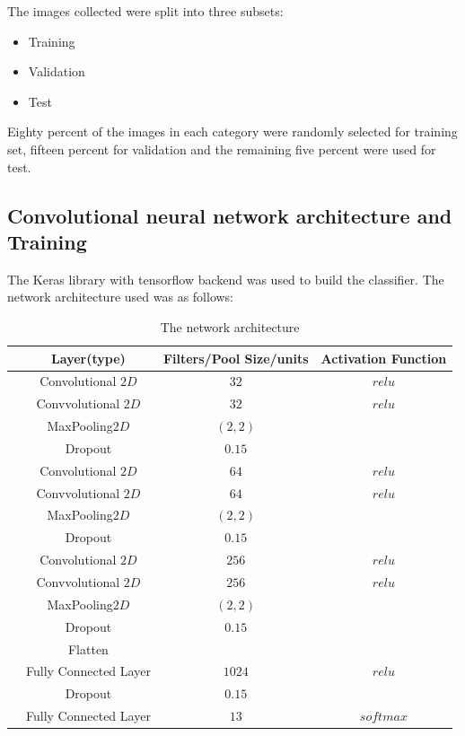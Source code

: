 \documentclass[11pt]{article}
\begin{document}
The images collected were split into three subsets: 
\begin{itemize}
	\item
	Training
	\item 
	Validation
	\item 
	Test
\end{itemize}
Eighty percent of the images in each category were randomly selected for training set, fifteen percent for validation and the remaining five percent were used for test.  
\subsection{Convolutional neural network architecture and Training}

The Keras library with tensorflow backend was used to build the classifier. The network architecture used was as follows:

\begin{center}
\begin{table}[H]
 \begin{tabular}{||c c c c||} 
 \hline
  & \textbf{Layer(type)} & \textbf{Filters/Pool Size/units} & \textbf{Activation Function} \\ [0.5ex] 
 \hline\hline
  & Convolutional $2D$ & $32$ & $relu$ \\ 
 \hline
  & Convvolutional $2D$ & $32$ & $relu$ \\
 \hline
  & MaxPooling$2D$ & $(2,2)$ & \\ 
 \hline
 & Dropout & $0.15$ &\\
 \hline
 & Convolutional $2D$ & $64$ & $relu$ \\ 
 \hline
  & Convvolutional $2D$ & $64$ & $relu$ \\
 \hline
  & MaxPooling$2D$ & $(2,2)$ & \\ 
 \hline
 & Dropout & $0.15$ &\\
 \hline
 & Convolutional $2D$ & $256$ & $relu$ \\ 
 \hline
  & Convvolutional $2D$ & $256$ & $relu$ \\
 \hline
  & MaxPooling$2D$ & $(2,2)$ & \\ 
 \hline
 & Dropout & $0.15$ &\\
 \hline
 & Flatten  &&\\
 \hline
 & Fully Connected Layer & $1024$ & $relu$\\
 \hline
 & Dropout & $0.15$ & \\
 \hline
 & Fully Connected Layer & $13$ & $softmax$\\
 \hline
\end{tabular}
\caption{The network architecture}
\end{table}
\end{center}
\end{document}
